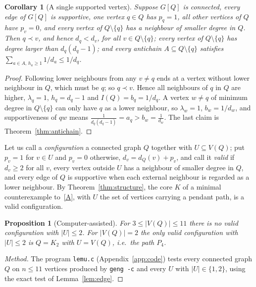 \documentclass[11pt]{amsart}
\newtheorem{proposition}[theorem]{Proposition}
\newtheorem{corollary}[theorem]{Corollary}
\theoremstyle{definition}
\begin{document}
\begin{corollary}[A single supported vertex]\label{cor:single}
Suppose $G[Q]$ is connected, every edge of $G[Q]$ is supportive, one vertex $q\in Q$ has $p_q=1$, all other vertices of
$Q$ have $p_v=0$, and every vertex of $Q\setminus\{q\}$ has a neighbour of smaller degree in $Q$. Then $q\prec v$, and
hence $d_q<d_v$, for all $v\in Q\setminus\{q\}$; every vertex of $Q\setminus\{q\}$ has degree larger than $d_q(d_q-1)$; and every antichain
$A\subseteq Q\setminus\{q\}$ satisfies $\sum_{a\in A,\,h_a\ge1}1/d_a\le 1/d_q$.
\end{corollary}

\begin{proof}
Following lower neighbours from any $v\neq q$ ends at a vertex without lower neighbour in $Q$, which must be $q$; so
$q\prec v$. Hence all neighbours of $q$ in $Q$ are higher, $\lambda_q=1$, $h_q=d_q-1$ and $I(Q)=b_q=1/d_q$. A vertex
$w\ne q$ of minimum degree in $Q\setminus\{q\}$ can only have $q$ as a lower neighbour, so $\lambda_w=1$, $b_w=1/d_w$,
and supportiveness of $qw$ means $\frac1{d_q(d_q-1)}=a_q>b_w=\frac1{d_w}$. The last claim is
Theorem~\ref{thm:antichain}.
\end{proof}

Let us call a \emph{configuration} a connected graph $Q$ together with $U\subseteq V(Q)$; put $p_v=1$ for $v\in U$ and
$p_v=0$ otherwise, $d_v=d_Q(v)+p_v$, and call it \emph{valid} if $d_v\ge2$ for all $v$, every vertex outside $U$ has a
neighbour of smaller degree in $Q$, and every edge of $Q$ is supportive when each external neighbour is regarded as a
lower neighbour. By Theorem~\ref{thm:structure}, the core $K$ of a minimal counterexample to~\eqref{A}, with $U$ the set
of vertices carrying a pendant path, is a valid configuration.

\begin{proposition}[Computer-assisted]\label{prop:fewsupport}
For $3\le|V(Q)|\le11$ there is no valid configuration with $|U|\le2$. For $|V(Q)|=2$ the only valid configuration with
$|U|\le2$ is $Q=K_2$ with $U=V(Q)$, i.e.\ the path $P_4$.
\end{proposition}

\begin{proof}[Method]
The program \texttt{lemu.c} (Appendix~\ref{app:code}) tests every connected graph $Q$ on $n\le11$ vertices produced by
\texttt{geng -c} and every $U$ with $|U|\in\{1,2\}$, using the exact test of Lemma~\ref{lem:edge}.
\end{proof}
\end{document}
